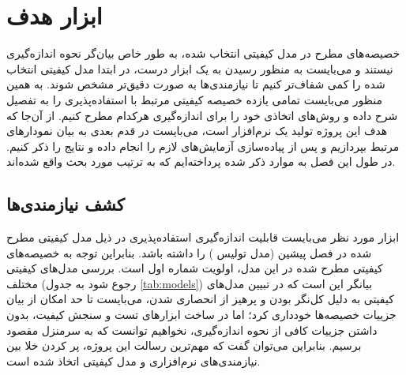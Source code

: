 \chapter{ابزار هدف}
خصیصه‌های مطرح در مدل کیفیتی انتخاب شده، به طور خاص بیان‌گر نحوه اندازه‌گیری نیستند و می‌بایست به منظور رسیدن به یک ابزار درست، در ابتدا مدل‌ کیفیتی انتخاب شده را کمی شفاف‌تر کنیم تا نیازمندی‌ها به صورت دقیق‌تر مشخص شوند. به همین منظور می‌بایست تمامی یازده خصیصه کیفیتی مرتبط با استفاده‌پذیری را به تفصیل شرح داده و روش‌های اتخاذی خود را برای اندازه‌گیری هرکدام مطرح کنیم. از آن‌جا که هدف این پروژه تولید یک نرم‌افزار است، می‌بایست در قدم بعدی به بیان نمودارهای مرتبط بپردازیم و پس از پیاده‌سازی آزمایش‌های لازم را انجام داده و نتایج را ذکر کنیم. در طول این فصل به موارد ذکر شده پرداخته‌ایم که به ترتیب مورد بحث واقع شده‌اند.
\section{کشف نیازمندی‌ها}
ابزار مورد نظر می‌بایست قابلیت اندازه‌گیری استفاده‌پذیری در ذیل مدل کیفیتی مطرح شده در فصل پیشین (مدل تولیس
\cite{albert_measuring_2013})
را داشته باشد. بنابراین توجه به خصیصه‌های کیفیتی مطرح شده در این مدل، اولویت شماره اول است. بررسی مدل‌های کیفیتی مختلف (رجوع شود به جدول
\ref{tab:models})
بیانگر این است که در تبیین مدل‌های کیفیتی به دلیل کل‌نگر بودن و پرهیز از انحصاری شدن، می‌بایست تا حد امکان از بیان جزییات خصیصه‌ها خودداری کرد؛ اما در ساخت ابزارهای تست و سنجش کیفیت، بدون داشتن جزییات کافی از نحوه اندازه‌گیری، نخواهیم توانست که به سرمنزل مقصود برسیم. بنابراین می‌توان گفت که مهم‌ترین رسالت این پروژه، پر کردن خلا بین نیازمندی‌های نرم‌افزاری و مدل کیفیتی اتخاذ شده است.
